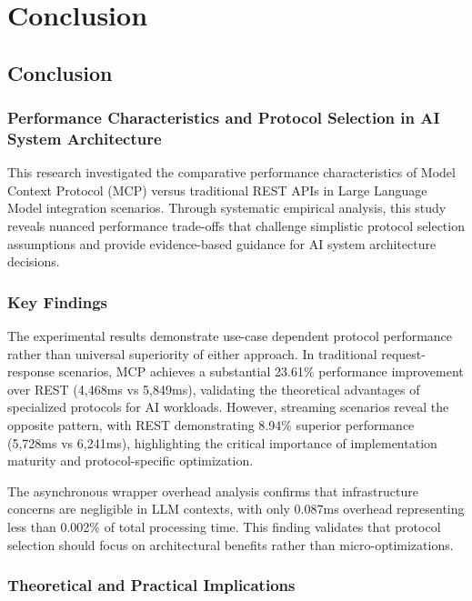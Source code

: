 \part{Conclusion}

\chapter{Conclusion}

\section{Performance Characteristics and Protocol Selection in AI System Architecture}

This research investigated the comparative performance characteristics of Model Context Protocol (MCP) versus traditional REST APIs in Large Language Model integration scenarios. Through systematic empirical analysis, this study reveals nuanced performance trade-offs that challenge simplistic protocol selection assumptions and provide evidence-based guidance for AI system architecture decisions.

\section{Key Findings}

The experimental results demonstrate use-case dependent protocol performance rather than universal superiority of either approach. In traditional request-response scenarios, MCP achieves a substantial 23.61\% performance improvement over REST (4,468ms vs 5,849ms), validating the theoretical advantages of specialized protocols for AI workloads. However, streaming scenarios reveal the opposite pattern, with REST demonstrating 8.94\% superior performance (5,728ms vs 6,241ms), highlighting the critical importance of implementation maturity and protocol-specific optimization.

The asynchronous wrapper overhead analysis confirms that infrastructure concerns are negligible in LLM contexts, with only 0.087ms overhead representing less than 0.002\% of total processing time. This finding validates that protocol selection should focus on architectural benefits rather than micro-optimizations.

\section{Theoretical and Practical Implications}

